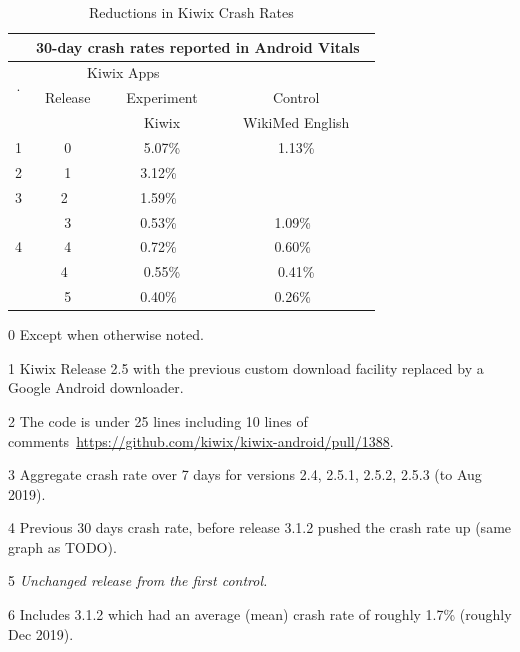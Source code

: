 \begin{table}
\caption{Reductions in Kiwix Crash Rates}
\footnotesize
\begin{center}
\begin{threeparttable}
\begin{tabular}{c c c c}
    \toprule
&\multicolumn{3}{c}{30-day crash rates reported in Android Vitals~\tnote{0}} \\
\midrule
\multirow{2}{*}{.} &\multicolumn{2}{c}{Kiwix Apps} \\
Stage &Release&\cellcolor[HTML]{efefef}Experiment &Control  \\

&\cellcolor[HTML]{efefef}&\cellcolor[HTML]{efefef}Kiwix & WikiMed English \\

1 &0 
  &\cellcolor[HTML]{efefef}5.07\% &1.13\% \\
2 &1 &\cellcolor[HTML]{efefef}3.12\%~\tnote{1} &\multirow{2}{*}{\cellcolor[HTML]{A8A8A8}}... \\
3 &2~\tnote{2} &\cellcolor[HTML]{efefef}1.59\%~\tnote{3} & \cellcolor[HTML]{A8A8A8}... \\
  &3 &\cellcolor[HTML]{efefef}0.53\%~\tnote{4} &1.09\%~\tnote{5} \\
4 &4 &\cellcolor[HTML]{efefef}0.72\%~\tnote{6} &0.60\%~\tnote{7} \\
  &4~\tnote{8} 
&\cellcolor[HTML]{efefef}0.55\% &0.41\% \\
  &5 &\cellcolor[HTML]{efefef}0.40\%~\tnote{9} &0.26\%~\tnote{10} \\
  \bottomrule
\end{tabular}
\begin{tablenotes}
  \item[0] Except when otherwise noted.
  \item[1] Kiwix Release 2.5 with the previous custom download facility replaced by a Google Android downloader.
  \item[2] The code is under 25 lines including 10 lines of comments~\url{https://github.com/kiwix/kiwix-android/pull/1388}.
  \item[3] Aggregate crash rate over 7 days for versions 2.4, 2.5.1, 2.5.2, 2.5.3 (to Aug  2019).
  \item[4] Previous 30 days crash rate, before release 3.1.2 pushed the crash rate up (same graph as TODO).
  \item[5] \emph{Unchanged release from the first control.}
  \item[6] Includes 3.1.2 which had an average (mean) crash rate of roughly 1.7\% (roughly  Dec 2019).

\end{tablenotes}
\end{threeparttable}
\end{center}
\end{table}
